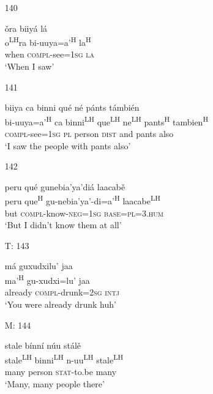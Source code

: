 \begin{itemize}
\item[140]
 
\glll   \v{o}ra biiy\'{a} l\'{a}\\
 o\textsuperscript{LH}ra bi-uuya=a'\textsuperscript{H}  la\textsuperscript{H} \\
 when \textsc{compl}-see=\textsc{1sg} \textsc{la}\\
\glt `When I saw'
 


\item[141]
 
\glll   biiya ca binni qu\'{e} n\'{e} p\'{a}nts t\'{a}mbi\'{e}n\\
 bi-uuya=a'\textsuperscript{H} ca binni\textsuperscript{LH} que\textsuperscript{LH} ne\textsuperscript{LH} pants\textsuperscript{H} tambien\textsuperscript{H}\\
 \textsc{compl}-see=\textsc{1sg} \textsc{pl} person \textsc{dist} and pants also\\
\glt `I saw the people with pants also'
 


\item[142]
 
\glll   peru qu\'{e} gunebia'ya'di\'{a} laacab\v{e}\\
 peru que\textsuperscript{H} gu-nebia'ya'-di=a'\textsuperscript{H} laacabe\textsuperscript{LH}\\
but \textsc{compl}-know-\textsc{neg}=\textsc{1sg} \textsc{base}=\textsc{pl}=\textsc{3.hum}\\
\glt `But I didn't know them at all'
 


\item[T: 143]
 
\glll  m\'{a} guxudxilu' jaa\\
ma'\textsuperscript{H} gu-xudxi=lu' jaa\\
already \textsc{compl}-drunk=\textsc{2sg} \textsc{intj}\\
\glt `You were already drunk huh'
 


\item[M: 144]
 
\glll   stale b\'{i}nn\'{i} n\'{u}u st\'{a}l\v{e}\\
stale\textsuperscript{LH} binni\textsuperscript{LH} n-uu\textsuperscript{LH} stale\textsuperscript{LH}\\
many person \textsc{stat}-to.be many\\
\glt `Many, many people there'
 



\end{itemize}
